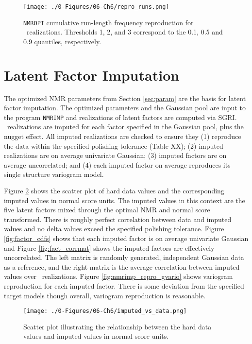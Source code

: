 \begin{figure}[htb!]
    \centering
    \texttt{[image: ./0-Figures/06-Ch6/repro\_runs.png]}
    \caption{\texttt{NMROPT} cumulative run-length frequency reproduction for \csnreals \ realizations. Thresholds 1, 2, and 3 correspond to the 0.1, 0.5 and 0.9 quantiles, respectively.}
    \label{fig:nmropt_repro_runs}
\end{figure}


\FloatBarrier
\section{Latent Factor Imputation}
\label{sec:fact_imp}

The optimized \gls{NMR} parameters from Section \ref{sec:param} are the basis for latent factor imputation. The optimized parameters and the Gaussian pool are input to the program \texttt{NMRIMP} and realizations of latent factors are computed via \gls{SGRI}. \csnreals \ realizations are imputed for each factor specified in the Gaussian pool, plus the nugget effect. All imputed realizations are checked to ensure they (1) reproduce the data within the specified polishing tolerance (Table XX); (2) imputed realizations are on average univariate Gaussian; (3) imputed factors are on average uncorrelated; and (4) each imputed factor on average reproduces its single structure variogram model.

Figure \ref{fig:imputed_vs_data} shows the scatter plot of hard data values and the corresponding imputed values in normal score units. The imputed values in this context are the five latent factors mixed through the optimal \gls{NMR} and normal score transformed. There is roughly perfect correlation between data and imputed values and no delta values exceed the specified polishing tolerance. Figure \ref{fig:factor_cdfs} shows that each imputed factor is on average univariate Gaussian and Figure \ref{fig:fact_corrmat} shows the imputed factors are effectively uncorrelated. The left matrix is randomly generated, independent Gaussian data as a reference, and the right matrix is the average correlation between imputed values over \csnreals \ realizations. Figure \ref{fig:nmrimp_repro_gvario} shows variogram reproduction for each imputed factor. There is some deviation from the specified target models though overall, variogram reproduction is reasonable.

\begin{figure}[htb!]
    \centering
    \texttt{[image: ./0-Figures/06-Ch6/imputed\_vs\_data.png]}
    \caption{Scatter plot illustrating the relationship between the hard data values and imputed values in normal score units. }
    \label{fig:imputed_vs_data}
\end{figure}

